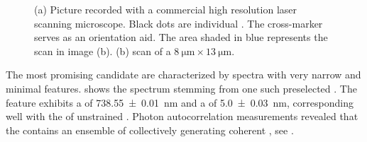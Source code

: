 			\begin{figure}[htp]
				\begin{subfigure}[t]{ 0.49\linewidth}
					\centering
					\caption{}
					\label{subfig::cross_laser_scan}
				\end{subfigure}
				\hfill
				\begin{subfigure}[t]{ 0.49\linewidth}
					\centering
					\caption{}
					\label{subfig::pp_pl_scan}
				\end{subfigure}
				\caption[Localizing suitable \nds]{(a) Picture recorded with a commercial high resolution laser scanning microscope. Black dots are individual \nds. The cross-marker serves as an orientation aid. The area shaded in blue represents the \pl scan in image (b). (b) \Pl scan of a
				$\SI{8}{\micro\metre} \times \SI{13}{\micro\metre}$. }
			\end{figure}

			The most promising candidate \nds are characterized by \fl spectra with very narrow \zpls and minimal \psb features.
			 shows the spectrum stemming from one such preselected \nd.
			The \ZPL feature exhibits a \cwl of \SI[separate-uncertainty = true]{738.55\pm0.01}{nm} and a \lw of \SI[separate-uncertainty = true]{5.0\pm0.03}{nm}, corresponding well with the \ZPL of unstrained \sivs. Photon autocorrelation measurements revealed that the \nd  contains an ensemble of \sivs collectively generating coherent \fl, see .

